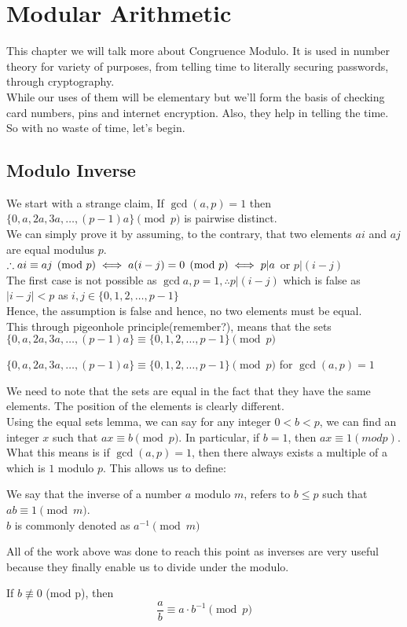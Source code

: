 \chapter{Modular Arithmetic}
This chapter we will talk more about Congruence Modulo. It is used in number theory for variety of purposes, from telling time to literally securing passwords, through cryptography. \\
While our uses of them will be elementary but we'll form the basis of checking card numbers, pins and internet encryption. Also, they help in telling the time.\\
So with no waste of time, let's begin.
\section{Modulo Inverse}
We start with a strange claim, If $\gcd(a,p)=1$ then $\{0,a,2a,3a,\dots,(p-1)a\} \pmod{p}$ is pairwise distinct.\\
We can simply prove it by assuming, to the contrary, that two elements $ai$ and $aj$ are equal modulus $p$.\\
$\therefore ai \equiv aj \pmod{p} \iff a(i-j) = 0\pmod{p}\\
\iff p|a$ or $p|(i-j)$\\
The first case is not possible as $\gcd{a,p}=1, \therefore p|(i-j)$ which is false as $|i-j|< p$ as $i,j \in \{0,1,2,\dots,p-1\}$\\
Hence, the assumption is false and hence, no two elements must be equal.\\
This through pigeonhole principle(remember?), means that the sets $\{0,a,2a,3a,\dots,(p-1)a\} \equiv \{0,1,2,\dots,p-1\} \pmod{p}$\\
\begin{theorem}
$\{0,a,2a,3a,\dots,(p-1)a\} \equiv \{0,1,2,\dots,p-1\} \pmod{p}$ for $\gcd(a,p)=1$
\end{theorem}
We need to note that the sets are equal in the fact that they have the same elements. The position of the elements is clearly different.\\
Using the equal sets lemma, we can say for any integer $0 < b < p$, we can find an integer $x$ such that $ax \equiv b\pmod{p}$.
In particular, if $b = 1$, then $ax \equiv 1 (mod p)$. What this means is if $\gcd(a, p) = 1$, then there always exists a multiple of a which is $1$ modulo $p$. This allows us to define:
\begin{definition}
We say that the inverse of a number $a$ modulo $m$, refers to $b \leq p$ such that $ab \equiv 1 \pmod{m}$.\\
$b$ is commonly denoted as $a^{-1} \pmod{m}$
\end{definition}
All of the work above was done to reach this point as inverses are very useful because they finally enable us to divide under the modulo.\\
\begin{theorem}
If $b\not\equiv0$ (mod p), then
\[\frac{a}{b} \equiv a \cdot b^{-1} \pmod{p}\]
\end{theorem}
